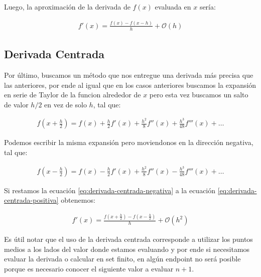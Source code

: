 \documentclass[twoside]{article}
\begin{document}
Luego, la aproximación de la derivada de $f(x)$ evaluada en $x$ sería:

\begin{tcolorbox}[colback=gray!20,colframe=black!40,title=Primera Derivada Retrasada]
  \begin{align}
    f' (x) = \frac{f (x)-f (x-h)}{h} + \mathcal{O} (h)
  \end{align}
\end{tcolorbox}

\subsection{Derivada Centrada}

Por último, buscamos un método que nos entregue una derivada más precisa que las anteriores, por ende 
al igual que en los casos anteriores buscamos la expansión en serie de Taylor de la funcion alrededor de $x$
pero esta vez buscamos un salto de valor $h/2$ en vez de solo $h$, tal que:

\begin{align}
  f \left( x + \frac{h}{2} \right) = f (x) + \frac{h}{2} f'(x) +\frac{h^2}{8}f''(x) + \frac{h^3}{48}f'''(x) + \dots \label{eq:derivada-centrada-positiva}
\end{align}

Podemos escribir la misma expansión pero moviendonos en la dirección negativa, tal que:

\begin{align}
  f \left( x - \frac{h}{2} \right) = f (x) - \frac{h}{2} f'(x) +\frac{h^2}{8}f''(x) - \frac{h^3}{48}f'''(x) + \dots \label{eq:derivada-centrada-negativa}
\end{align}

Si restamos la ecuación \eqref{eq:derivada-centrada-negativa} a la ecuación \eqref{eq:derivada-centrada-positiva} obtenemos:

\begin{tcolorbox}[colback=gray!20,colframe=black!40,title=Primera Derivada Centrada]
  \begin{align}
    f' (x) = \frac{f (x + \frac{h}{2})-f (x- \frac{h}{2})}{h} + \mathcal{O} (h^2)
  \end{align}
\end{tcolorbox}

Es útil notar que el uso de la derivada centrada corresponde a utilizar los puntos medios a los lados del valor donde estamos evaluando
y por ende si necesitamos evaluar la derivada o calcular en set finito, en algún endpoint no será posible porque es necesario conocer el siguiente valor a evaluar $n+1$.
\end{document}
